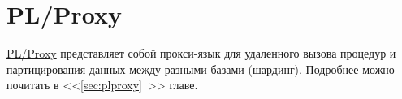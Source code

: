 \section{PL/Proxy}

\href{http://pgfoundry.org/projects/plproxy/}{PL/Proxy} представляет собой прокси-язык для удаленного вызова процедур и партицирования данных между разными базами (шардинг). Подробнее можно почитать в <<\ref{sec:plproxy}~>> главе.